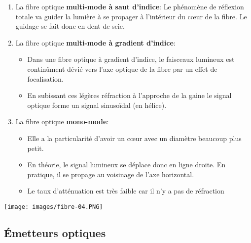 \documentclass[a4paper]{article}
\begin{document}
\begin{enumerate}
    \item La fibre optique \textbf{multi-mode à saut d'indice}: Le phénomène de réflexion totale va guider la lumière à se propager à l'intérieur du cœur de la fibre. Le guidage se fait donc en dent de scie.
    \item La fibre optique \textbf{multi-mode à gradient d'indice}:
    \begin{itemize}
        \item Dans une fibre optique à gradient d'indice, le faisceaux lumineux est continûment dévié vers l’axe optique de la fibre par un effet de focalisation.
        \item En subissant ces légères réfraction à l'approche de la gaine le signal optique forme un signal sinusoïdal (en hélice).
    \end{itemize}
    \item La fibre optique \textbf{mono-mode}:
    \begin{itemize}
        \item Elle a la particularité d'avoir un cœur avec un diamètre beaucoup plus petit.
        \item En théorie, le signal lumineux se déplace donc en ligne droite. En pratique, il se propage au voisinage de l'axe horizontal.
        \item Le taux d'atténuation est très faible car il n'y a pas de réfraction
    \end{itemize}
\end{enumerate}
\begin{center}
    \texttt{[image: images/fibre-04.PNG]}
\end{center}





\subsection{Émetteurs optiques} %
\end{document}
